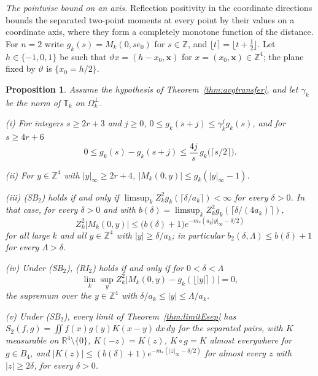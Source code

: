 \documentclass[aps,prd,twocolumn,superscriptaddress,nofootinbib,longbibliography,floatfix,amsmath,amssymb,10pt]{revtex4-2}
\newtheorem{proposition}[theorem]{Proposition}
\theoremstyle{definition}
\theoremstyle{remark}
\newcommand{\R}{\mathbb{R}}
\newcommand{\Z}{\mathbb{Z}}
\begin{document}
\emph{The pointwise bound on an axis.} Reflection positivity in the
coordinate directions bounds the separated two-point moments at every point
by their values on a coordinate axis, where they form a completely monotone
function of the distance. For $n=2$ write $g_k(s)=M_k(0,se_0)$ for
$s\in\Z$, and $\lfloor t\rceil=\lfloor t+\frac12\rfloor$. Let $h\in\{-1,0,1\}$
be such that $\vartheta x=(h-x_0,\mathbf x)$ for $x=(x_0,\mathbf x)\in\Z^4$;
the plane fixed by $\vartheta$ is $\{x_0=h/2\}$.

\begin{proposition}\label{prop:limitEaxial}
Assume the hypothesis of Theorem~\textup{\ref{thm:avgtransfer}}, and let
$\gamma_k$ be the norm of $\mathbb T_k$ on $\Omega_k^\perp$.

\textup{(i)} For integers $s\ge2r+3$ and $j\ge0$, $0\le g_k(s+j)\le
\gamma_k^jg_k(s)$, and for $s\ge4r+6$
\[
0\le g_k(s)-g_k(s+j)\le\frac{4j}s\,g_k\bigl(\lceil s/2\rceil\bigr) .
\]

\textup{(ii)} For $y\in\Z^4$ with $|y|_\infty\ge2r+4$, $|M_k(0,y)|\le
g_k(|y|_\infty-1)$.

\textup{(iii)} \textup{(SB$_2$)} holds if and only if $\limsup_kZ_k^2
g_k(\lceil\delta/a_k\rceil)<\infty$ for every $\delta>0$. In that case, for
every $\delta>0$ and with $b(\delta)=\limsup_kZ_k^2g_k(\lceil\delta/(4a_k)
\rceil)$,
\[
Z_k^2|M_k(0,y)|\le\bigl(b(\delta)+1\bigr)e^{-m_*(a_k|y|_\infty-\delta/2)}
\]
for all large $k$ and all $y\in\Z^4$ with $|y|\ge\delta/a_k$; in particular
$b_2(\delta,\Lambda)\le b(\delta)+1$ for every $\Lambda>\delta$.

\textup{(iv)} Under \textup{(SB$_2$)}, \textup{(RI$_2$)} holds if and only
if for $0<\delta<\Lambda$
\[
\lim_k\sup_yZ_k^2\bigl|M_k(0,y)-g_k(\lfloor|y|\rceil)\bigr|=0,
\]
the supremum over the $y\in\Z^4$ with $\delta/a_k\le|y|\le\Lambda/a_k$.

\textup{(v)} Under \textup{(SB$_2$)}, every limit of
Theorem~\textup{\ref{thm:limitEsep}} has $S_2(f,g)=\iint f(x)g(y)K(x-y)\,dx
\,dy$ for the separated pairs, with $K$ measurable on $\R^4\setminus\{0\}$,
$K(-z)=K(z)$, $K\circ g=K$ almost everywhere for $g\in B_4$, and
$|K(z)|\le(b(\delta)+1)e^{-m_*(|z|_\infty-\delta/2)}$ for almost every $z$
with $|z|\ge2\delta$, for every $\delta>0$.
\end{proposition}
\end{document}
